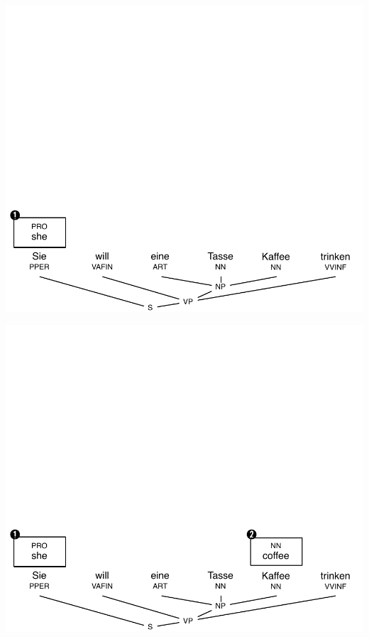 \documentclass[landscape]{uedslides2C}
\begin{document}

\vspace{-31mm}
\begin{center}
\includegraphics[scale=1.15]{chart-parsing1.pdf}
\end{center}


\vspace{-31mm}
\begin{center}
\includegraphics[scale=1.15]{chart-parsing2.pdf}
\end{center}
\end{document}
